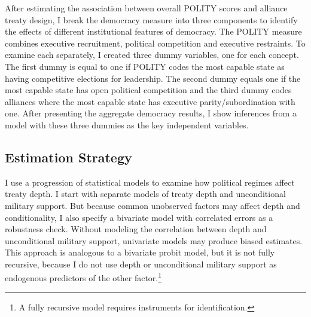 \documentclass[12pt]{article}
\begin{document}
After estimating the association between overall POLITY scores and alliance treaty design, I break the democracy measure into three components to identify the effects of different institutional features of democracy.  
The POLITY measure combines executive recruitment, political competition and executive restraints. 
To examine each separately, I created three dummy variables, one for each concept. 
The first dummy is equal to one if POLITY codes the most capable state as having competitive elections for leadership.
The second dummy equals one if the most capable state has open political competition and the third dummy codes alliances where the most capable state has executive parity/subordination with one. 
After presenting the aggregate democracy results, I show inferences from a model with these three dummies as the key independent variables.



\subsection{Estimation Strategy}



I use a progression of statistical models to examine how political regimes affect treaty depth. 
I start with separate models of treaty depth and unconditional military support. 
But because common unobserved factors may affect depth and conditionality, I also specify a bivariate model with correlated errors as a robustness check. 
Without modeling the correlation between depth and unconditional military support, univariate models may produce biased estimates. 
This approach is analogous to a bivariate probit model, but it is not fully recursive, because I do not use depth or unconditional military support as endogenous predictors of the other factor.\footnote{A fully recursive model requires instruments for identification.}  
\end{document}
